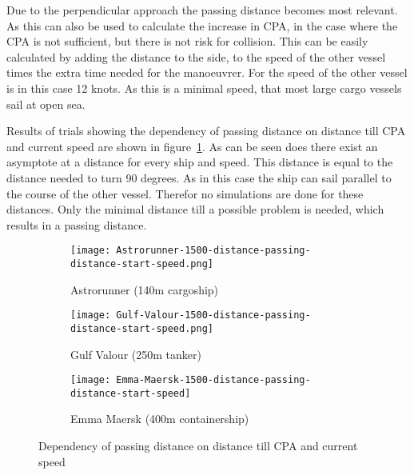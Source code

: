 Due to the perpendicular approach the passing distance becomes most relevant. As this can also be used to calculate the increase in CPA, in the case where the CPA is not sufficient, but there is not risk for collision. This can be easily calculated by adding the distance to the side, to the speed of the other vessel times the extra time needed for the manoeuvrer. For the speed of the other vessel is in this case 12 knots. As this is a minimal speed, that most large cargo vessels sail at open sea. 

Results of trials showing the dependency of passing distance on distance till CPA and current speed are shown in figure~\ref{fig:result-distance-passing-distance-start-speed}.
As can be seen does there exist an asymptote at a distance for every ship and speed. This distance is equal to the distance needed to turn 90 degrees. As in this case the ship can sail parallel to the course of the other vessel. Therefor no simulations are done for these distances. Only the minimal distance till a possible problem is needed, which results in a passing distance. 

\begin{figure}[!p]
	\centering
	\begin{subfigure}[b]{0.6\textwidth}
		\texttt{[image: Astrorunner-1500-distance-passing-distance-start-speed.png]} 
		\caption{Astrorunner (140m  cargoship)} 
	\end{subfigure}
	\begin{subfigure}[b]{0.6\linewidth}
		\texttt{[image: Gulf-Valour-1500-distance-passing-distance-start-speed.png]} 
		\caption{Gulf Valour (250m tanker)} 
	\end{subfigure}
	\begin{subfigure}[b]{0.6\textwidth}
		\texttt{[image: Emma-Maersk-1500-distance-passing-distance-start-speed]} 
		\caption{Emma Maersk (400m containership)} 
	\end{subfigure}
	\caption{Dependency of passing distance on distance till CPA and current speed} 
	\label{fig:result-distance-passing-distance-start-speed} 
\end{figure}

